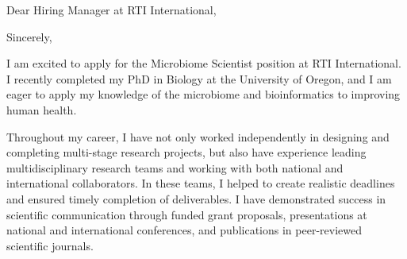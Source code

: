 \documentclass[11pt,letterpaper,sans]{moderncv}        %
\begin{document}
%



\clearpage
\date{February 27, 2023}
\opening{Dear Hiring Manager at RTI International,}
\closing{Sincerely,}
\makelettertitle

I am excited to apply for the Microbiome Scientist position at RTI
International. I recently completed my PhD in Biology at the University of
Oregon, and I am eager to apply my knowledge of the microbiome and
bioinformatics to improving human health.

Throughout my career, I have not only worked independently in designing and
completing multi-stage research projects, but also have experience leading
multidisciplinary research teams and working with both national and
international collaborators. In these teams, I helped to create realistic
deadlines and ensured timely completion of deliverables. I have demonstrated
success in scientific communication through funded grant proposals,
presentations at national and international conferences, and publications in
peer-reviewed scientific journals. 
\end{document}
